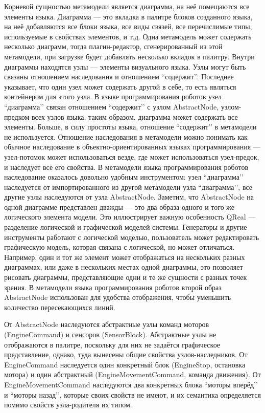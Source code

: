 \documentclass[a4paper]{article}
\begin{document}
Корневой сущностью метамодели является диаграмма, на неё помещаются все элементы языка. Диаграмма --- это вкладка в палитре блоков созданного языка, на неё добавляются все блоки языка, все виды связей, все перечислимые типы, используемые в свойствах элементов, и т.д. Одна метамодель может содержать несколько диаграмм, тогда плагин-редактор, сгенерированный из этой метамодели, при загрузке будет добавлять несколько вкладок в палитру. Внутри диаграммы находятся узлы --- элементы визуального языка. Узлы могут быть связаны отношением наследования и отношением ``содержит’’. Последнее указывает, что один узел может содержать другой в себе, то есть являться контейнером для этого узла. В языке программирования роботов узел ``диаграмма’’ связан отношением ``содержит’’ с узлом AbstractNode, узлом-предком всех узлов языка, таким образом, диаграмма может содержать все элементы. Больше, в силу простоты языка, отношение ``содержит’’ в метамодели не используется. Отношение наследования в метамодели можно понимать как обычное наследование в объектно-ориентированных языках программирования --- узел-потомок может использоваться везде, где может использоваться узел-предок, и наследует все его свойства. В метамодели языка программирования роботов наследование оказалось довольно удобным инструментом: узел ``диаграмма’’ наследуется от импортированного из другой метамодели узла ``диаграмма’’, все другие узлы наследуются от узла AbstractNode. Заметим, что AbstractNode на одной диаграмме представлен дважды --- это два образа одного и того же логического элемента модели. Это иллюстрирует важную особенность QReal --- разделение логической и графической моделей системы. Генераторы и другие инструменты работают с логической моделью, пользователь может редактировать графическую модель, которая связана с логической, но может отличаться. Например, один и тот же элемент может отображаться на нескольких разных диаграммах, или даже в нескольких местах одной диаграммы, это позволяет рисовать диаграммы, представляющие одни и те же сущности с разных точек зрения. В метамодели языка программирования роботов второй образ AbstractNode использован для удобства отображения, чтобы уменьшить количество пересекающихся линий.

От AbstractNode наследуются абстрактные узлы команд моторов (EngineCommand) и сенсоров (SensorBlock). Абстрактные узлы не отображаются в палитре, поскольку для них не задаётся графическое представление, однако, туда вынесены общие свойства узлов-наследников. От EngineCommand наследуется один конкретный блок (EngineStop, остановка мотора) и один абстрактный (EngineMovementCommand, команда движения). От EngineMovementCommand наследуются два конкретных блока ``моторы вперёд’’ и ``моторы назад’’, которые своих свойств не имеют, и их семантика определяется помимо свойств узла-родителя их типом. 
\end{document}
